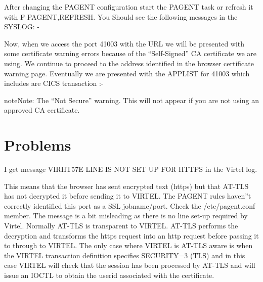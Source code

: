 \documentclass[letterpaper,10pt,english]{sphinxmanual}
\begin{document}
After changing the PAGENT configuration start the PAGENT task or refresh it with F PAGENT,REFRESH. You Should see the following messages in the SYSLOG: -

\begin{sphinxVerbatim}[commandchars=\\\{\}]
 
         
    
\end{sphinxVerbatim}

Now, when we access the port 41003 with the URL  we will be presented with some certificate warning errors because of the “Self-Signed” CA certificate we are using. We continue to proceed to the address identified in the browser certificate warning page. Eventually we are presented with the APPLIST for 41003 which includes are CICS transaction :-


\begin{sphinxadmonition}{note}{Note:}
The “Not Secure” warning. This will not appear if you are not using an approved CA certificate.
\end{sphinxadmonition}

\newpage


\section{Problems}
\label{\detokenize{TN202002:id2}}

I get message VIRHT57E LINE IS NOT SET UP FOR HTTPS in the Virtel log.


This means that the browser has sent encrypted text (https) but that AT-TLS has not decrypted it before sending it to VIRTEL. The PAGENT rules haven”t correctly identified this port as a SSL jobname/port. Check the /etc/pagent.conf member. The message is a bit misleading as there is no line set-up required by Virtel.  Normally AT-TLS is transparent to VIRTEL. AT-TLS performs the decryption and transforms the https request into an http request before passing it to through to VIRTEL. The only case where VIRTEL is AT-TLS aware is when the VIRTEL transaction definition specifies SECURITY=3 (TLS) and in this case VIRTEL will check that the session has been processed by AT-TLS and will issue an IOCTL to obtain the userid associated with the certificate.
\end{document}
